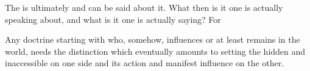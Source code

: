 \label{se:GodGodhead}
The  is ultimately  and  can be said
about it.  What then is it one is actually speaking
about, and what is it one is actually saying?   For 

\pa\label{GodheadGod}
Any doctrine starting with  who,
somehow, influences or at least remains  in the world, needs the
distinction which eventually amounts to setting the hidden and inaccessible on
one side and its action and manifest influence on the other.

